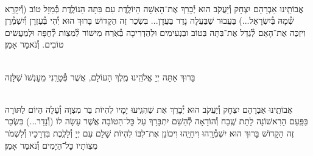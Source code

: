 \documentclass[twoside, openany, parskip=half, 11pt]{book}
\begin{document}
\begin{small}
\\
אֲבוֹתֵֽינוּ אַבְרָהָם יִצְחָק וְ֯יַעֲקֹב הוּא יְ֯בָרֵךְ אֶת־הָאִשָׁה הַיוֹלֶֽדֶת
עִם בִּתָּה הַנוֹלֶֽדֶת בְּ֯מַזָל טוֹב (וְ֯יִקָרֵא שְׁ֯מָהּ בְּ֯יִשְׂרָאֵל...) בַּעֲבוּר שֶׁבַּעֲלָה נָדַר בַּעֲדָן... בִּשְׂכַר זֶה הַקָדוֹשׁ בָּרוּךְ הוּא יְ֯הִי בְּ֯עֶזְרָן וְ֯יִשְׁמְ֯רֵן וִיזַכֶּה אֶת־הָאֵם לְ֯גַדֵל אֶת־בִּתָּה בַּטוֹב ובַנְעִימִים וּלְהַדְרִיכָה בְּ֯אֹֽרַח מִישׁוֹר לְ֯מִצְוֹת לְ֯חֻפָּה וּלְמַעֲשִׂים טוֹבִים. וְ֯נֹאמַר אָמֵן׃


\\
בָּרוּךְ אַתָּה יְיָ אֱלֹהֵֽינוּ מֶֽלֶךְ הָעוֹלָם, אֲשֶׁר פְּ֯טָרַֽנִי מֵעׇנְשׁוׂ שֶׁלָּזֶה

\\
אֲבוֹתֵֽינוּ אַבְרָהָם יִצְחָק וְ֯יַעֲקֹב הוּא יְ֯בָרֵךְ אֶת
שֶׁהִגִֽיעוּ יָמָיו לִהְיוֹת בַּר מִצְוָה וְ֯עָלָה הַיוֹם לַתּוֹרָה בַּפַּֽעַם הָרִאשׁוֹנָה לָתֵת שֶֽׁבַח וְ֯הוֹדָאָה לְ֯הַשֵׁם יִתְבָּרַךְ עַל כׇּל־הַטוֹבָה אֲשֶׁר עָשָׂה לוֹ (וְ֯נָדַר...) בִּשְׂכַר זֶה הַקָדוֹשׁ בָּרוּךְ הוּא יִשְׁמְ֯רֵֽהוּ וִיחַיֵֽהוּ וִיכוֹנֵן אֶת־לִבּוֹ לִהְיוֹת שָׁלֵם עִם יְיָ וְ֯לָלֶֽכֶת בִּדְרָכָיו וְ֯לִשְׁמֹר מִצְוֹתָיו כׇּל־הַיָמִים וְ֯נֹאמַר אָמֵן׃


\end{small}

\sepline

\\
\halfkaddish


\newcommand{\hagbaha}{
\instruction{הגבה:}
\firstword{וְ֯זֹ֖את הַתּוֹרָ֑ה}\source{דברים ד}
אֲשֶׁר־שָׂ֣ם מֹשֶׁ֔ה לִפְנֵ֖י בְּנֵ֥י יִשְׂרָאֵֽל׃
עַל־פִּ֥י \source{במדבר ט}יְיָ֖ בְּ֯יַד־מֹשֶֽׁה׃
עֵץ־חַיִּ֣ים \source{משלי ג} הִ֭יא לַמַּחֲזִיקִ֣ים בׇּ֑הּ וְֽתֹמְכֶ֥יהָ מְ֯אֻשָּֽׁר׃
דְּרָכֶ֥יהָ דַרְכֵי־נֹ֑עַם וְֽכׇל־נְתִ֖יבוֹתֶ֣יהָ שָׁלֽוֹם׃
אֹ֣רֶךְ יָ֭מִים בִּֽימִינׇ֑הּ בִּ֝שְׂמֹאולׇ֗הּ עֹ֣שֶׁר וְ֯כָבֽוֹד׃
יְיָ֥ \source{ישעיה מב}חָפֵ֖ץ לְ֯מַ֣עַן צִדְק֑וֹ יַגְדִּ֥יל תּוֹרָ֖ה וְ֯יַאְדִּֽיר׃

}


\newcommand{\yehalelu}{
\shatz
\begin{large}
\textbf{יְ֯הַלְ֯ל֤וּ ׀ אֶת־שֵׁ֬ם יְיָ֗ כִּֽי־נִשְׂגָּ֣ב שְׁמ֣וֹ לְ֯בַדּ֑וֹ}\source{תהלים קמח}
\end{large}

\kahal
ה֝וֹד֗וֹ עַל־אֶ֥רֶץ וְ֯שָׁמָֽיִם׃ וַיָּ֤רֶם קֶ֨רֶן ׀ לְ֯עַמּ֡וֹ תְּהִלָּ֤ה לְֽכׇל־חֲסִידָ֗יו לִבְנֵ֣י יִ֭שְׂרָאֵל עַ֥ם קְ֯רֹב֗וֹ הַֽלְ֯לוּ־יׇֽהּ׃
}
\end{document}
